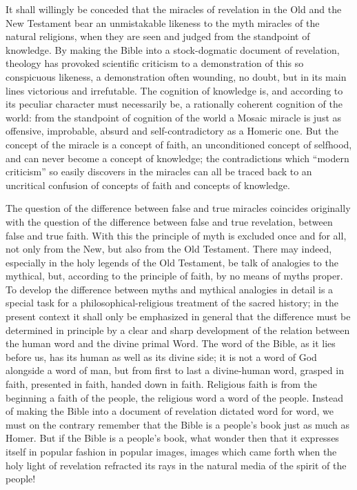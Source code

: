 \documentclass[12pt]{book}
\newcommand{\opage}[1]{\marginnote{\footnotesize\textit{[#1]}}}
\begin{document}
It shall willingly be conceded that the miracles of revelation in the
Old and the New Testament bear an unmistakable likeness to the myth
miracles of the natural religions, when they are seen and judged from
the standpoint of knowledge. By making the Bible into a stock-dogmatic
document of revelation, theology has provoked scientific criticism to a
demonstration of this so conspicuous likeness, a demonstration often
wounding, no doubt, but in its main lines victorious and irrefutable.
The cognition of knowledge is, and according to its peculiar character
must necessarily be, a rationally coherent cognition of the world: from
the standpoint of cognition of the world a Mosaic miracle is just as
offensive, improbable, absurd and self-contradictory as a Homeric one.
But the concept of the miracle is a concept of faith, an unconditioned
concept of selfhood, and can never become a concept of knowledge; the
contradictions which ``modern criticism'' so easily discovers in the
miracles can all be traced back to an uncritical confusion of concepts
of faith and concepts of knowledge.

The question of the difference between false and true miracles coincides
originally with the question of the difference between false and true
revelation, between false and true faith. With this the principle of
myth is excluded once and for all, not only from the New, but also from
the Old Testament. There may indeed, especially in the holy legends of
the Old Testament, be talk of analogies to the mythical, but, according
to the principle of faith, by no means of myths proper. To develop the
difference between myths and mythical analogies in detail is a special
task for a philosophical-religious treatment of the sacred history; in
the present context it shall only be emphasized in general that the
difference must
\opage{104}\setcounter{footnote}{0}%
be determined in principle by a clear and sharp development of the
relation between the human word and the divine primal Word. The word of
the Bible, as it lies before us, has its human as well as its divine
side; it is not a word of God alongside a word of man, but from first to
last a divine-human word, grasped in faith, presented in faith, handed
down in faith. Religious faith is from the beginning a faith of the
people, the religious word a word of the people. Instead of making the
Bible into a document of revelation dictated word for word, we must on
the contrary remember that the Bible is a people's book just as much as
Homer. But if the Bible is a people's book, what wonder then that it
expresses itself in popular fashion in popular images, images which
came forth when the holy light of revelation refracted its rays in the
natural media of the spirit of the people!
\end{document}
